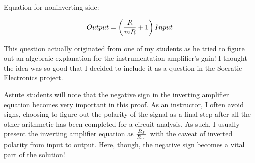 \vskip 10pt

\noindent
Equation for noninverting side:

$$Output = \left( {R \over mR} + 1 \right) Input$$







This question actually originated from one of my students as he tried to figure out an algebraic explanation for the instrumentation amplifier's gain!  I thought the idea was so good that I decided to include it as a question in the Socratic Electronics project.

Astute students will note that the negative sign in the inverting amplifier equation becomes very important in this proof.  As an instructor, I often avoid signs, choosing to figure out the polarity of the signal as a final step after all the other arithmetic has been completed for a circuit analysis.  As such, I usually present the inverting amplifier equation as ${R_f \over R_{in}}$ with the caveat of inverted polarity from input to output.  Here, though, the negative sign becomes a vital part of the solution!




